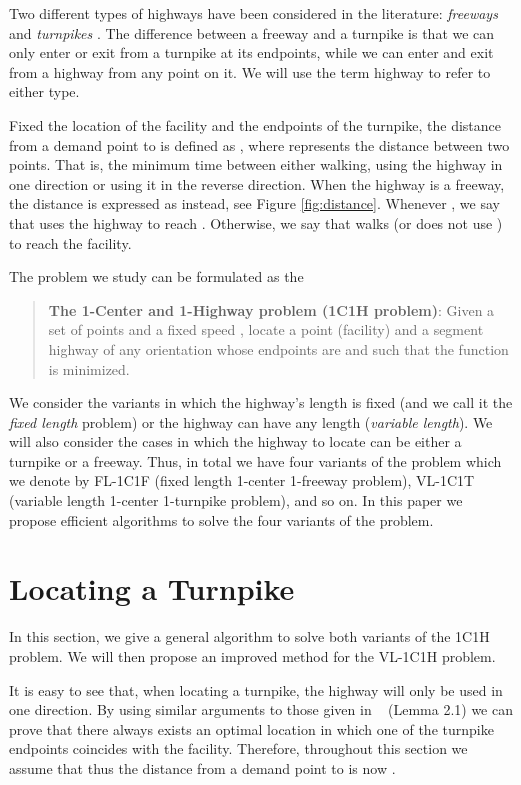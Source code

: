 \documentclass{llncs}
\begin{document}
Two different types of highways have been considered in the literature: {\em freeways} \cite{aap-qpsscvd-04,kt-oishcm-08} and {\em turnpikes} \cite{cardinal08,bae09}. The difference between a freeway and a turnpike is that we can only enter or exit from a turnpike at its endpoints, while we can enter and exit from a highway from any point on it. We will use the term highway to refer to either type.

Fixed the location of the facility and the endpoints  of the turnpike, the distance from a demand point  to  is defined as , where  represents the  distance between two points. That is, the minimum time between either walking, using the highway in one direction or using it in the reverse direction. When the highway is a freeway, the distance is expressed as  instead, see Figure \ref{fig:distance}. Whenever , we say that  uses the highway to reach . Otherwise, we say that  walks (or does not use ) to reach the facility.



The problem we study can be formulated as the 
\begin{quote}
{\bf The 1-Center and 1-Highway problem (1C1H problem)}: Given a set  of  points and a fixed speed , locate a point (facility)  and a segment highway  of any orientation whose endpoints are  and  such that the function  is minimized.
\end{quote}

We consider the variants in which the highway's length  is fixed (and we call it the {\em fixed length} problem) or the highway can have any length ({\em variable length}). We will also consider the cases in which the highway to locate can be either a turnpike or a freeway. Thus,  in total we have four variants of the problem which we denote by FL-1C1F (fixed length 1-center 1-freeway problem), VL-1C1T (variable length 1-center 1-turnpike problem), and so on. In this paper we propose efficient algorithms to solve the four variants of the problem. 



\section{Locating a Turnpike}

In this section, we give a general algorithm to solve both variants of the 1C1H problem.
We will then propose an improved method for the VL-1C1H problem.

\medskip


It is easy to see that, when locating a turnpike, the highway will only be used in one direction.
By using similar arguments to those given in ~\cite{espejo11} (Lemma 2.1) we can prove that there always exists an optimal location in which one of the turnpike  endpoints coincides with the facility.
Therefore, throughout this section we assume that  thus the distance from a demand point  to  is now .
\end{document}
